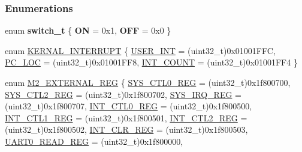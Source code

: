 \subsubsection*{Enumerations}
\begin{DoxyCompactItemize}
\item 
\mbox{\label{a00020_ab43e533f3793920486fb81c580f71564}} 
enum {\bfseries switch\+\_\+t} \{ {\bfseries ON} = 0x1, 
{\bfseries O\+FF} = 0x0
 \}
\item 
enum \mbox{\hyperlink{a00020_a4ecccde27f29cedbe9bc6a22e3aad16f}{K\+E\+R\+N\+A\+L\+\_\+\+I\+N\+T\+E\+R\+R\+U\+PT}} \{ \mbox{\hyperlink{a00020_a4ecccde27f29cedbe9bc6a22e3aad16fa2c882d4b03fdd083b40f2807ea7c0bf2}{U\+S\+E\+R\+\_\+\+I\+NT}} = (uint32\+\_\+t)0x01001\+F\+FC, 
\mbox{\hyperlink{a00020_a4ecccde27f29cedbe9bc6a22e3aad16fa2a5bd1194e8dba9ee7ed1d1039942739}{P\+C\+\_\+\+L\+OC}} = (uint32\+\_\+t)0x01001\+F\+F8, 
\mbox{\hyperlink{a00020_a4ecccde27f29cedbe9bc6a22e3aad16fa529ec3035e124aebce1fd8b0a0b7c408}{I\+N\+T\+\_\+\+C\+O\+U\+NT}} = (uint32\+\_\+t)0x01001\+F\+F4
 \}
\item 
enum \mbox{\hyperlink{a00020_adadaa0ab1ebbd7ba9b70dfd24c3ed44d}{M2\+\_\+\+E\+X\+T\+E\+R\+N\+A\+L\+\_\+\+R\+EG}} \{ \newline
\mbox{\hyperlink{a00020_adadaa0ab1ebbd7ba9b70dfd24c3ed44dab61d9968d782d6c00e9de838e38913f5}{S\+Y\+S\+\_\+\+C\+T\+L0\+\_\+\+R\+EG}} = (uint32\+\_\+t)0x1f800700, 
\mbox{\hyperlink{a00020_adadaa0ab1ebbd7ba9b70dfd24c3ed44da7dd70f67b5962a7974603376399afb49}{S\+Y\+S\+\_\+\+C\+T\+L2\+\_\+\+R\+EG}} = (uint32\+\_\+t)0x1f800702, 
\mbox{\hyperlink{a00020_adadaa0ab1ebbd7ba9b70dfd24c3ed44da9c4ce03a199984a23165617318767eca}{S\+Y\+S\+\_\+\+I\+R\+Q\+\_\+\+R\+EG}} = (uint32\+\_\+t)0x1f800707, 
\mbox{\hyperlink{a00020_adadaa0ab1ebbd7ba9b70dfd24c3ed44da417bb62509b1343f4685a023c8ec4b09}{I\+N\+T\+\_\+\+C\+T\+L0\+\_\+\+R\+EG}} = (uint32\+\_\+t)0x1f800500, 
\mbox{\hyperlink{a00020_adadaa0ab1ebbd7ba9b70dfd24c3ed44dabc5f0d33bb47527f3d8a9c20250d5c5b}{I\+N\+T\+\_\+\+C\+T\+L1\+\_\+\+R\+EG}} = (uint32\+\_\+t)0x1f800501, 
\mbox{\hyperlink{a00020_adadaa0ab1ebbd7ba9b70dfd24c3ed44dafba45e74edabe7b9fd6d0c36e8492bcd}{I\+N\+T\+\_\+\+C\+T\+L2\+\_\+\+R\+EG}} = (uint32\+\_\+t)0x1f800502, 
\mbox{\hyperlink{a00020_adadaa0ab1ebbd7ba9b70dfd24c3ed44da33cabaff7369092ec0e29dd2ffb0cb3d}{I\+N\+T\+\_\+\+C\+L\+R\+\_\+\+R\+EG}} = (uint32\+\_\+t)0x1f800503, 
\mbox{\hyperlink{a00020_adadaa0ab1ebbd7ba9b70dfd24c3ed44da744e0b80c93cc5242d28ebff68af035c}{U\+A\+R\+T0\+\_\+\+R\+E\+A\+D\+\_\+\+R\+EG}} = (uint32\+\_\+t)0x1f800000, 

\end{DoxyCompactItemize}
